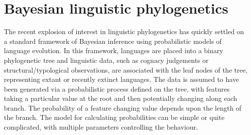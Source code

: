 \documentclass[10pt,a4paper]{article}
\begin{document}


\section{Bayesian linguistic phylogenetics}

The recent explosion of interest in linguistic phylogenetics has quickly settled on a standard framework of Bayesian inference using probabilistic models of language evolution.  In this framework, languages are placed into a binary phylogenetic tree and linguistic data, such as cognacy judgements or structural/typological observations, are associated with the leaf nodes of the tree, representing extant or recently extinct languages. The data is assumed to have been generated via a probabilistic process defined on the tree, with features taking a particular value at the root and then potentially changing along each branch.  The probability of a feature changing value depends upon the length of the branch. The model for calculating probabilities can be simple or quite complicated, with multiple parameters controlling the behaviour.
\end{document}
